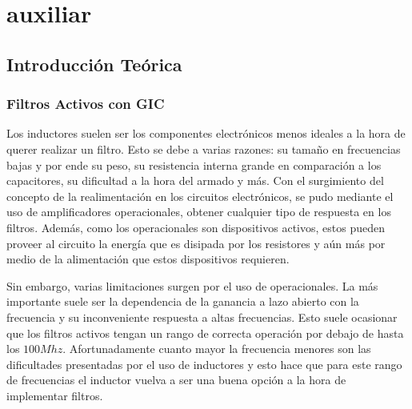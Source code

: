 %
%
%
%
%
%
%
%
%




\tableofcontents
\break
\section{auxiliar}

\subsection{Introducción Teórica}

\subsubsection{Filtros Activos con GIC}

Los inductores suelen ser los componentes electrónicos menos ideales a la hora de querer realizar un filtro. Esto se debe a varias razones: su tamaño en frecuencias bajas y por ende su peso, su resistencia interna grande en comparación a los capacitores, su dificultad a la hora del armado y más. Con el surgimiento del concepto de la realimentación en los circuitos electrónicos, se pudo mediante el uso de amplificadores operacionales, obtener cualquier tipo de respuesta en los filtros. Además, como los operacionales son dispositivos activos, estos pueden proveer al circuito la energía que es disipada por los resistores y aún más por medio de la alimentación que estos dispositivos requieren.

Sin embargo, varias limitaciones surgen por el uso de operacionales. La más importante suele ser la dependencia de la ganancia a lazo abierto con la frecuencia y su inconveniente respuesta a altas frecuencias. Esto suele ocasionar que los filtros activos tengan un rango de correcta operación por debajo de hasta los $100Mhz$. Afortunadamente cuanto mayor la frecuencia menores son las dificultades presentadas por el uso de inductores y esto hace que para este rango de frecuencias el inductor vuelva a ser una buena opción a la hora de implementar filtros.

